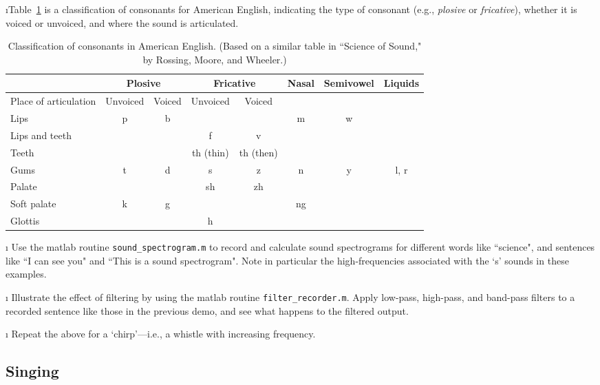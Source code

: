 \i Table~\ref{t:consonants} is a classification of 
consonants for American English, indicating the 
type of consonant (e.g., {\em plosive} or {\em fricative}), 
whether it is voiced or unvoiced, and where
the sound is articulated.
%
\begin{table}[htbp]
\begin{center}
\begin{tabular}{|l|c|c|c|c|c|c|c|}
\hline
& \multicolumn{2}{|c|}{Plosive}
& \multicolumn{2}{|c|}{Fricative}
& Nasal & Semivowel & Liquids 
\\
\hline
Place of articulation & Unvoiced & Voiced 
& Unvoiced & Voiced & & & \\
\hline
Lips & p & b & & & m & w & \\
Lips and teeth & & & f & v & & & \\
Teeth & & & th (thin) & th (then) & & & \\
Gums & t & d & s & z & n & y & l, r \\
Palate & & & sh & zh & & & \\
Soft palate & k & g & & & ng & & \\
Glottis & & & h & & & & \\
\hline
\end{tabular}
\caption{Classification of consonants in American English.
(Based on a similar table in
``Science of Sound," by Rossing, Moore, and Wheeler.)}
\label{t:consonants}
\end{center}
\end{table}

\i \demo
Use the matlab routine {\tt sound\_spectrogram.m} to 
record and calculate sound spectrograms for different
words like ``science", and sentences
like ``I can see you" and ``This is a sound spectrogram".
Note in particular the high-frequencies associated with
the `s' sounds in these examples.

\i \demo
Illustrate the effect of filtering by using the 
matlab routine {\tt filter\_recorder.m}.
Apply low-pass, high-pass, and band-pass filters to 
a recorded sentence like those in the previous demo,
and see what happens to the filtered output.

\i \demo
Repeat the above for a `chirp'---i.e., a whistle with 
increasing frequency.

\ei
\subsection{Singing}
\bi

